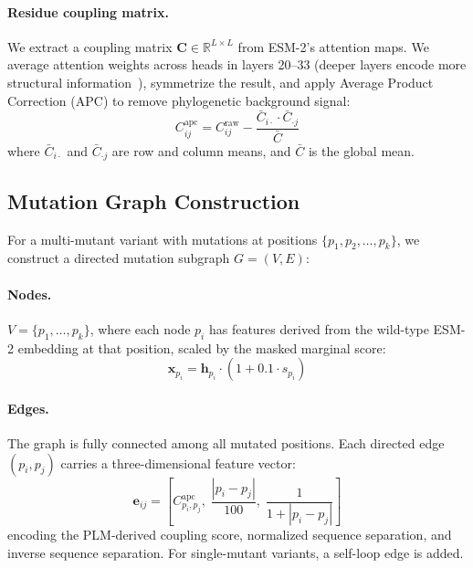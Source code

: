 \documentclass{article}
\newcommand{\bx}{\mathbf{x}}
\newcommand{\bh}{\mathbf{h}}
\newcommand{\bC}{\mathbf{C}}
\newcommand{\R}{\mathbb{R}}
\begin{document}
\paragraph{Residue coupling matrix.}
We extract a coupling matrix $\bC \in \R^{L \times L}$ from ESM-2's attention maps.
We average attention weights across heads in layers 20--33 (deeper layers encode more structural information~\citep{rao2021msa}), symmetrize the result, and apply Average Product Correction (APC) to remove phylogenetic background signal:
\begin{equation}
    C_{ij}^{\text{apc}} = C_{ij}^{\text{raw}} - \frac{\bar{C}_{i\cdot} \cdot \bar{C}_{\cdot j}}{\bar{C}}
\end{equation}
where $\bar{C}_{i\cdot}$ and $\bar{C}_{\cdot j}$ are row and column means, and $\bar{C}$ is the global mean.

\subsection{Mutation Graph Construction}

For a multi-mutant variant with mutations at positions $\{p_1, p_2, \ldots, p_k\}$, we construct a directed mutation subgraph $G = (V, E)$:

\paragraph{Nodes.}
$V = \{p_1, \ldots, p_k\}$, where each node $p_i$ has features derived from the wild-type ESM-2 embedding at that position, scaled by the masked marginal score:
\begin{equation}
    \bx_{p_i} = \bh_{p_i} \cdot (1 + 0.1 \cdot s_{p_i})
\end{equation}

\paragraph{Edges.}
The graph is fully connected among all mutated positions.
Each directed edge $(p_i, p_j)$ carries a three-dimensional feature vector:
\begin{equation}
    \mathbf{e}_{ij} = \left[ C_{p_i, p_j}^{\text{apc}}, \; \frac{|p_i - p_j|}{100}, \; \frac{1}{1 + |p_i - p_j|} \right]
\end{equation}
encoding the PLM-derived coupling score, normalized sequence separation, and inverse sequence separation.
For single-mutant variants, a self-loop edge is added.
\end{document}
